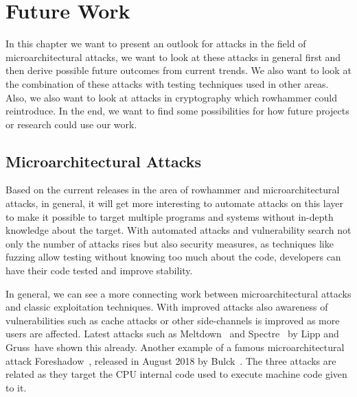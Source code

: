 \chapter{Future Work}\label{sec:futurework}

In this chapter we want to present an outlook for attacks in the field of
microarchitectural attacks, we want to look at these attacks in general first
and then derive possible future outcomes from current trends. We also want to
look at the combination of these attacks with testing techniques used in other
areas. Also, we also want to look at attacks in cryptography which rowhammer
could reintroduce. In the end, we want to find some possibilities for how future
projects or research could use our work.

\section{Microarchitectural Attacks}

Based on the current releases in the area of rowhammer and microarchitectural
attacks, in general, it will get more interesting to automate attacks on this
layer to make it possible to target multiple programs and systems without
in-depth knowledge about the target. With automated attacks and vulnerability
search not only the number of attacks rises but also security measures, as
techniques like fuzzing allow testing without knowing too much about the code,
developers can have their code tested and improve stability.

In general, we can see a more connecting work between microarchitectural attacks
and classic exploitation techniques. With improved attacks also awareness of
vulnerabilities such as cache attacks or other side-channels is improved as more
users are affected. Latest attacks such as Meltdown~\cite{meltdown} and
Spectre~\cite{spectre} by Lipp and Gruss~\etal have shown this already. Another
example of a famous microarchitectural attack Foreshadow~\cite{foreshadow},
released in August 2018 by Bulck~\etal. The three attacks are related as they
target the CPU internal code used to execute machine code given to it.

